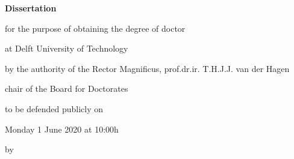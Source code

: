 \begin{titlepage}
\pagecolor{mDarkTeal}\afterpage{\nopagecolor}
{\color{mLightBrown}%
\begin{center}

\vspace*{2\bigskipamount}

{\makeatletter
\titlestyle\bfseries\LARGE\@title
\makeatother}

{\makeatletter
\ifx\@subtitle\undefined\else
    \bigskip
    \titlefont\titleshape\Large\@subtitle
\fi
\makeatother}

\end{center}
}
\cleardoublepage
\thispagestyle{empty}

\begin{center}


\vspace*{2\bigskipamount}

{\makeatletter
\titlestyle\bfseries\LARGE\@title
\makeatother}

{\makeatletter
\ifx\@subtitle\undefined\else
    \bigskip
    \titlefont\titleshape\Large\@subtitle
\fi
\makeatother}

\vfill


{\Large\titlefont\bfseries Dissertation}

\bigskip
\bigskip

for the purpose of obtaining the degree of doctor

at Delft University of Technology

by the authority of the Rector Magnificus, prof.dr.ir. T.H.J.J. van der Hagen

chair of the Board for Doctorates

to be defended publicly on

Monday 1 June 2020 at 10:00h

\bigskip
\bigskip

by

\bigskip
\bigskip

\makeatletter
{\Large\titlefont\bfseries\@firstname\ {\titleshape\@lastname}}
\makeatother


\end{center}
\end{titlepage}
